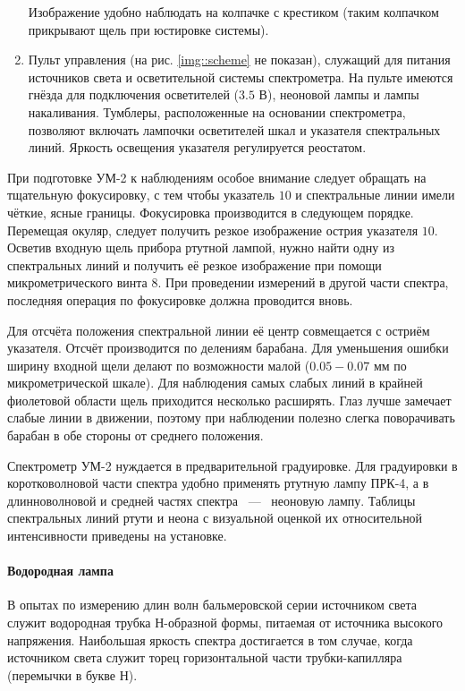 \begin{enumerate}
        Изображение удобно наблюдать на колпачке с крестиком (таким колпачком прикрывают щель при юстировке системы).
  \item Пульт управления (на рис. \ref{img::scheme} не показан), служащий для
        питания источников света и осветительной системы спектрометра. На пульте
        имеются гнёзда для подключения осветителей ($3.5$ В), неоновой лампы и лампы
        накаливания. Тумблеры, расположенные на основании спектрометра, позволяют
        включать лампочки осветителей шкал и указателя спектральных линий. Яркость
        освещения указателя регулируется реостатом.
\end{enumerate}

При подготовке УМ-2 к наблюдениям особое внимание следует обращать на тщательную
фокусировку, с тем чтобы указатель $10$ и спектральные линии имели чёткие, ясные
границы. Фокусировка производится в следующем порядке. Перемещая окуляр, следует
получить резкое изображение острия указателя $10$. Осветив входную щель прибора
ртутной лампой, нужно найти одну из спектральных линий и получить её резкое
изображение при помощи микрометрического винта $8$. При проведении измерений в
другой части спектра, последняя операция по фокусировке должна проводится вновь.

Для отсчёта положения спектральной линии её центр совмещается с остриём
указателя. Отсчёт производится по делениям барабана. Для уменьшения ошибки
ширину входной щели делают по возможности малой ($0.05-0.07$ мм по
микрометрической шкале). Для наблюдения самых слабых линий в крайней фиолетовой
области щель приходится несколько расширять. Глаз лучше замечает слабые линии в
движении, поэтому при наблюдении полезно слегка поворачивать барабан в обе
стороны от среднего положения.

Спектрометр УМ-2 нуждается в предварительной градуировке. Для градуировки в
коротковолновой части спектра удобно применять ртутную лампу ПРК-4, а в
длинноволновой и средней частях спектра ~---~ неоновую лампу. Таблицы
спектральных линий ртути и неона с визуальной оценкой их относительной
интенсивности приведены на установке.

\paragraph{Водородная лампа}
В опытах по измерению длин волн бальмеровской серии источником света служит
водородная трубка Н-образной формы, питаемая от источника высокого напряжения.
Наибольшая яркость спектра достигается в том случае, когда источником света
служит торец горизонтальной части трубки-капилляра (перемычки в букве Н).

